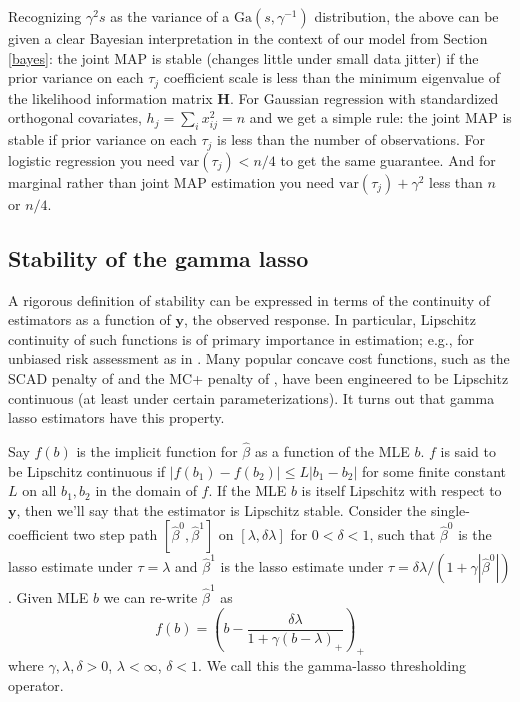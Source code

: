 \documentclass[12pt]{article}
\newcommand{\mr}[1]{\mathrm{#1}}
\newcommand{\bm}[1]{\mathbf{#1}}
\begin{document}
Recognizing $\gamma^2 s$ as the variance of a $\mr{Ga}(s,\gamma^{-1})$
distribution, the above can be given a clear Bayesian interpretation in the
context of our model from Section \ref{bayes}:  the joint MAP is stable
(changes little under small data jitter)  if the prior variance on each
$\tau_j$ coefficient scale is less than the minimum eigenvalue of the likelihood information
matrix $\bm{H}$. For Gaussian regression with standardized orthogonal
covariates, $h_j = \sum_i x_{ij}^2 = n$ and we get a simple rule: the joint
MAP is stable  if prior variance on each $\tau_j$  is
less than the number of observations.  For logistic regression you need
$\mr{var}(\tau_j) < n/4$ to get the same guarantee. And for marginal rather
than joint MAP estimation you need $\mr{var}(\tau_j) + \gamma^2$ less than $n$
or $n/4$.


\subsection{Stability of the gamma lasso}

A rigorous definition of stability can be expressed in terms of the continuity
of  estimators as a function of $\bm{y}$, the observed response.  In
particular, Lipschitz continuity of such functions is of primary importance in
estimation; e.g., for unbiased risk assessment as in
\cite{stein_estimation_1981}.  Many popular concave cost functions, such as
the SCAD penalty of \cite{fan_variable_2001} and the MC+ penalty of
\citet{zhang_nearly_2010}, have been engineered to be Lipschitz continuous (at
least under certain parameterizations).  It turns out that gamma lasso
estimators have this property.

Say $f(b)$ is the implicit function for $\hat\beta$ as a function of the MLE
$b$.  $f$ is said to be Lipschitz continuous if  $ |f(b_1)-f(b_2)| \leq
L|b_1-b_2| $ for some finite constant $L$ on all $b_1,b_2$ in the domain of
$f$. If the MLE $b$ is itself Lipschitz with respect to $\bm{y}$, then we'll
say that the estimator is Lipschitz stable.    Consider the single-coefficient
two step path $[\hat\beta^0,\hat\beta^1]$ on $[\lambda,\delta\lambda]$ for
$0<\delta<1$, such that $\hat\beta^0$ is the lasso estimate under $\tau =
\lambda$ and $\hat\beta^1$ is the lasso estimate under $\tau =
\delta\lambda/(1+\gamma|\hat\beta^0|)$. Given MLE $b$ we can re-write
$\hat\beta^1$ as \begin{equation}\label{twostep} f(b) = \left(b -
\frac{\delta\lambda}{1+\gamma(b-\lambda)_+}\right)_+  \end{equation} where
$\gamma,\lambda,\delta >0$, $\lambda < \infty$, $\delta<1$.  We call this the
gamma-lasso thresholding operator.
\end{document}
